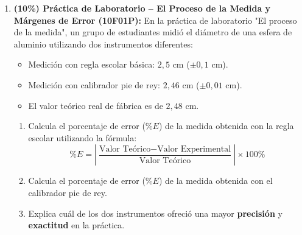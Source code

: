 \documentclass[11pt, letterpaper]{article}
\newif\ifshowanswers
\newcommand{\answer}[1]{
	\ifshowanswers
	\par\vspace{0.15cm}
	\begin{tcolorbox}[colback=blue!5!white, colframe=blue!60!white, arc=1mm, boxrule=0.5pt, title=\textbf{\footnotesize SOLUCIÓN PASO A PASO (DOCENTE)}]
		\color{blue!80!black}\footnotesize #1
	\end{tcolorbox}
	\par\vspace{0.15cm}
	\else
	\par\vspace{0.3cm}
	\fi
}
\begin{document}
\begin{enumerate}[leftmargin=*, itemsep=0.8cm]
		\item \textbf{(10\%) Práctica de Laboratorio -- El Proceso de la Medida y Márgenes de Error (10F01P):} 
		En la práctica de laboratorio "El proceso de la medida", un grupo de estudiantes midió el diámetro de una esfera de aluminio utilizando dos instrumentos diferentes:
		\begin{itemize}
			\item Medición con regla escolar básica: $2,5\text{ cm}$ ($\pm 0,1\text{ cm}$).
			\item Medición con calibrador pie de rey: $2,46\text{ cm}$ ($\pm 0,01\text{ cm}$).
			\item El valor teórico real de fábrica es de $2,48\text{ cm}$.
		\end{itemize}
		\begin{enumerate}[label=\alph*), itemsep=0.2cm]
			\item Calcula el porcentaje de error ($\% E$) de la medida obtenida con la regla escolar utilizando la fórmula:
			\[ \% E = \left| \frac{\text{Valor Teórico} - \text{Valor Experimental}}{\text{Valor Teórico}} \right| \times 100\% \]
			\item Calcula el porcentaje de error ($\% E$) de la medida obtenida con el calibrador pie de rey.
			\item Explica cuál de los dos instrumentos ofreció una mayor \textbf{precisión} y \textbf{exactitud} en la práctica.
		\end{enumerate}
		
		\answer{
			\textbf{Cálculo de márgenes de error:}
			\begin{itemize}[itemsep=0.2cm]
				\item a) Error con Regla escolar: $\% E = \left| \frac{2,48 - 2,5}{2,48} \right| \times 100\% = \left| \frac{-0,02}{2,48} \right| \times 100\% \approx \mathbf{0,806\%}$.
				\item b) Error con Calibrador pie de rey: $\% E = \left| \frac{2,48 - 2,46}{2,48} \right| \times 100\% = \left| \frac{0,02}{2,48} \right| \times 100\% \approx \mathbf{0,806\%}$.
				\item c) \textbf{Análisis de precisión y exactitud:} Ambos instrumentos resultaron ofrecer idéntica \textbf{exactitud} (el porcentaje de error respecto al valor teórico es el mismo). Sin embargo, el calibrador pie de rey ofrece una mayor \textbf{precisión} debido a su menor incertidumbre o sensibilidad de escala ($\pm 0,01\text{ cm}$ frente a $\pm 0,1\text{ cm}$ de la regla), permitiendo realizar mediciones centesimales.
			\end{itemize}
		}
		

\end{enumerate}
\end{document}
